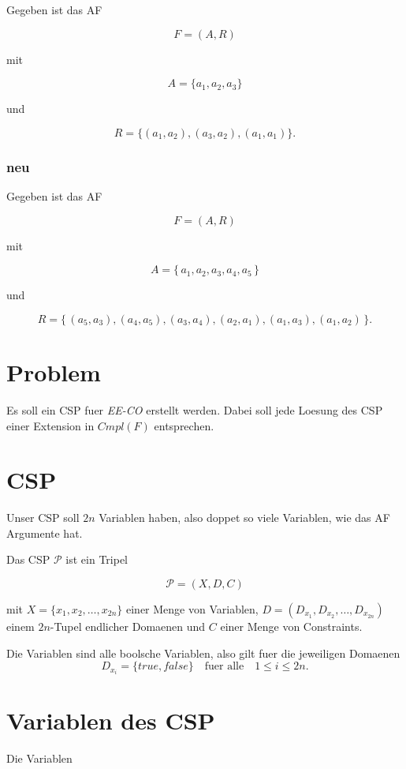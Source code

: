 Gegeben ist das AF

\[ F = (A,R) \]

mit

\[ A = \{a_1,a_2,a_3\} \]

und

\[ R = \{(a_1,a_2), (a_3,a_2), (a_1,a_1)\} .\]

\subsubsection{neu}\label{neu}

Gegeben ist das AF

\[ F = (A,R) \]

mit

\[ A = \{\,a_1,a_2,a_3,a_4,a_5\,\} \]

und

\[ R = \{\,(a_5,a_3),(a_4,a_5),(a_3,a_4),(a_2,a_1),(a_1,a_3),(a_1,a_2)\,\} .\]

\section{Problem}\label{problem}

Es soll ein CSP fuer \emph{EE-CO} erstellt werden. Dabei soll jede
Loesung des CSP einer Extension in $Cmpl(F)$ entsprechen.

\section{CSP}\label{csp}

Unser CSP soll $2n$ Variablen haben, also doppet so viele Variablen, wie
das AF Argumente hat.

Das CSP $\mathscr{P}$ ist ein Tripel

\[ \mathscr{P} = (X,D,C) \]

mit $X = \{x_1,x_2,\dots,x_{2n}\} $ einer Menge von Variablen,
$D = (D_{x_1},D_{x_2},\dots,D_{x_{2n}}) $ einem $2n$-Tupel endlicher
Domaenen und $C$ einer Menge von Constraints.

Die Variablen sind alle boolsche Variablen, also gilt fuer die
jeweiligen Domaenen
\[ D_{x_i} = \{true, false\} \quad\text{fuer alle}\quad 1\leq i \leq 2n .\]

\section{Variablen des CSP}\label{variablen-des-csp}

Die Variablen


